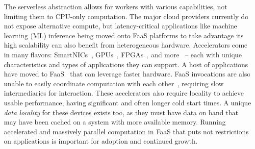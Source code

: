 The serverless abstraction allows for workers with various capabilities, not limiting them to CPU-only computation.
The major cloud providers currently do not expose alternative compute, but latency-critical applications like machine learning (ML) inference being moved onto FaaS platforms to take advantage its high scalability can also benefit from heterogeneous hardware.
Accelerators come in many flavors: SmartNICs~\cite{choi2020lambda}, GPUs~\cite{pemberton2022kernel,guleria2019emf}, FPGAs~\cite{bacis2020blastfunction}, and more~\cite{du2022serverless,romero2021llama} -- each with unique characteristics and types of applications they can support.
A host of applications have moved to FaaS~\cite{yang2022infless,ali2022optimizing,zhang2019video,risco2021gpu,hung2019rapid,shankar2020serverless} that can leverage faster hardware.
FaaS invocations are also unable to easily coordinate computation with each other~\cite{yuan2022smpi,copik2023fmi,copik2022faaskeeper,sreekanti2020fault,sreekanti2020cloudburst,giantsidi2023flexlog,xu2021lambdadnn}, requiring slow intermediaries for interaction.
These accelerators also require locality to achieve usable performance, having significant and often longer cold start times.
A unique \emph{data locality} for these devices exists too, as they must have data on hand that may have been cached on a system with more available memory.
Running accelerated and massively parallel computation in FaaS that puts not restrictions on applications is important for adoption and continued growth.

